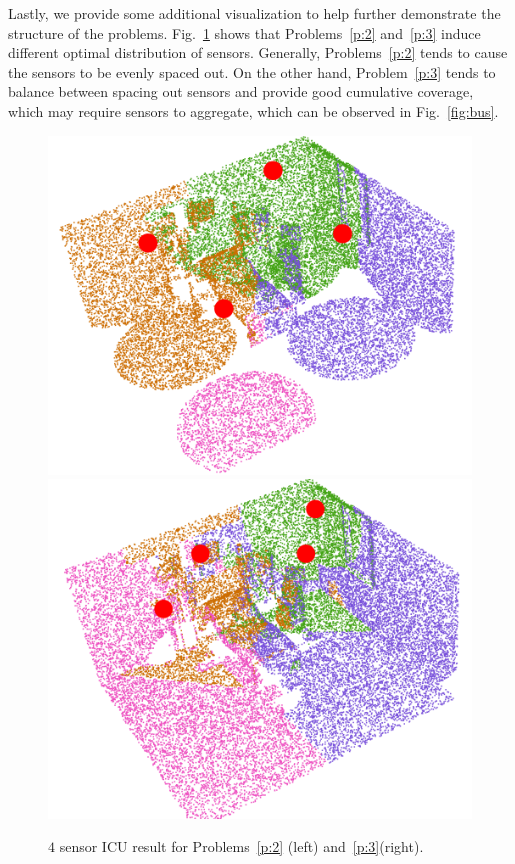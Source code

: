 
Lastly, we provide some additional visualization to help further demonstrate the structure of the problems. Fig.~\ref{fig:icu-comp} shows that Problems~\ref{p:2} and~\ref{p:3} induce different optimal distribution of sensors. Generally, Problems~\ref{p:2} tends to cause the sensors to be evenly spaced out. On the other hand, Problem~\ref{p:3} tends to balance between spacing out sensors and provide good cumulative coverage, which may require sensors to aggregate, which can be observed in Fig.~\ref{fig:bus}.

\begin{figure}[!ht]
\vspace{1mm}
    \centering
    \includegraphics[width = 0.35\columnwidth]{chapters/surf/fig/icu-2-4.png}\hspace{3mm}
    \includegraphics[width = 0.35\columnwidth]{chapters/surf/fig/icu-3-4.png}
\vspace{1mm}
    \caption{$4$ sensor ICU result for Problems~\ref{p:2} (left) and~\ref{p:3}(right).}
    \label{fig:icu-comp}
\end{figure}

